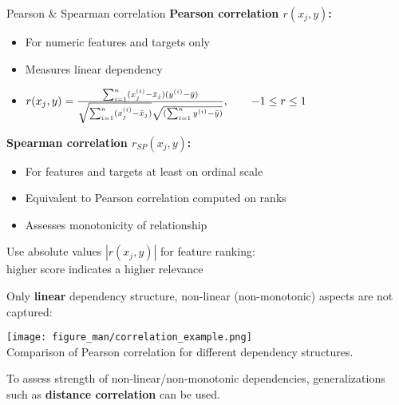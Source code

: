 \documentclass[11pt,compress,t,notes=noshow, xcolor=table]{beamer}
\begin{document}
  \begin{vbframe}{Pearson \& Spearman correlation}
  \textbf{Pearson correlation $r(x_j, y)$: }
  \begin{itemize}
    \item For numeric features and targets only
    \item Measures linear dependency
    \item $ r(x_j, y) = \frac{\sum_{i=1}^n (x^{(i)}_j - \bar{x}_j) (y^{(i)} - \bar{y})}{\sqrt{\sum_{i=1}^n (x^{(i)}_j - \bar{x}_j)} \sqrt{(\sum_{i=1}^n y^{(i)} - \bar{y})}},\qquad -1 \le r \le 1$
  \end{itemize}
  \vspace{0.4cm}
  \textbf{Spearman correlation $r_{SP}(x_j, y)$:}
  \begin{itemize}
    \item For features and targets at least on ordinal scale
    \item Equivalent to Pearson correlation computed on ranks
    \item Assesses monotonicity of relationship
  \end{itemize}
  \lz
  Use absolute values $|r(x_j, y)|$ for feature ranking:\\
  higher score indicates a higher relevance

  \framebreak

  Only \textbf{linear} dependency structure, non-linear (non-monotonic) aspects are not captured:

  \lz

  \begin{center}
\texttt{[image: figure\_man/correlation\_example.png]}\\
\footnotesize{Comparison of Pearson correlation for different dependency structures.}
  \end{center}
  \vspace{0.1cm}
  To assess strength of non-linear/non-monotonic dependencies, generalizations such as \textbf{distance correlation} can be used.


\end{vbframe}
\end{document}
